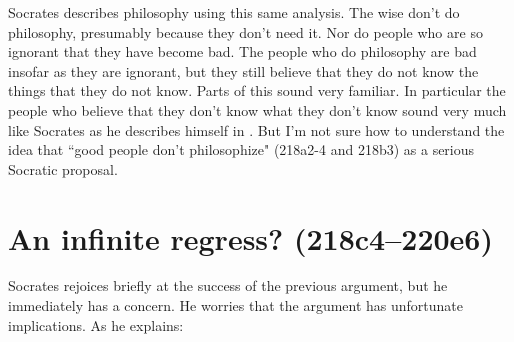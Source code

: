 \documentclass[11pt]{article}
\begin{document}
Socrates describes philosophy using this same analysis.  The wise don't do
philosophy, presumably because they don't need it.  Nor do people who are
so ignorant that they have become bad.  The people who do philosophy are
bad insofar as they are ignorant, but they still believe that they do not
know the things that they do not know.  Parts of this sound very familiar.
In particular the people who believe that they don't know what they don't
know sound very much like Socrates as he describes himself in
.  But I'm not sure how to understand the idea that ``good
people don't philosophize" (218a2-4 and 218b3) as a serious Socratic
proposal.


\section{An infinite regress? (218c4--220e6)}

Socrates rejoices briefly at the success of the previous argument, but he
immediately has a concern.  He worries that the argument has unfortunate
implications.  As he explains:
\end{document}

